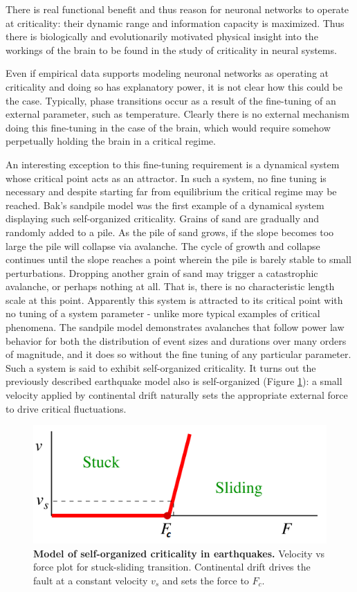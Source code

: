 \documentclass[12pt]{article}
\begin{document}
There is real functional benefit and thus reason for neuronal networks to operate at criticality: their dynamic range and information capacity is maximized. Thus there is biologically and evolutionarily motivated physical insight into the workings of the brain to be found in the study of criticality in neural systems.

Even if empirical data supports modeling neuronal networks as operating at criticality and doing so has explanatory power, it is not clear how this could be the case. Typically, phase transitions occur as a result of the fine-tuning of an external parameter, such as temperature. Clearly there is no external mechanism doing this fine-tuning in the case of the brain, which would require somehow perpetually holding the brain in a critical regime. 

An interesting exception to this fine-tuning requirement is a dynamical system whose critical point acts as an attractor. In such a system, no fine tuning is necessary and despite starting far from equilibrium the critical regime may be reached. Bak's sandpile model\cite{Bak1987a} was the first example of a dynamical system displaying such self-organized criticality. Grains of sand are gradually and randomly added to a pile. As the pile of sand grows, if the slope becomes too large the pile will collapse via avalanche. The cycle of growth and collapse continues until the slope reaches a point wherein the pile is barely stable to small perturbations. Dropping another grain of sand may trigger a catastrophic avalanche, or perhaps nothing at all. That is, there is no characteristic length scale at this point. Apparently this system is attracted to its critical point with no tuning of a system parameter - unlike more typical examples of critical phenomena. The sandpile model demonstrates avalanches that follow power law behavior for both the distribution of event sizes and durations over many orders of magnitude, and it does so without the fine tuning of any particular parameter. Such a system is said to exhibit self-organized criticality. It turns out the previously described earthquake model also is self-organized (Figure \ref{Figure::Power law behavior in earthquakes}): a small velocity applied by continental drift naturally sets the appropriate external force to drive critical fluctuations\cite{Sethna2011a}.

\begin{figure}      
  \begin{center}    
 \includegraphics[width=.50\textwidth]{sethnaSSquakes}    
    \caption{\textbf{Model of self-organized criticality in earthquakes\cite{Sethna2011a}.} Velocity vs force plot for stuck-sliding transition. Continental drift drives the fault at a constant velocity $v_{s}$ and sets the force to $F_{c}$.}
   \label{Figure::Power law behavior in earthquakes}   
  \end{center}     
   \end{figure}
   
\end{document}
